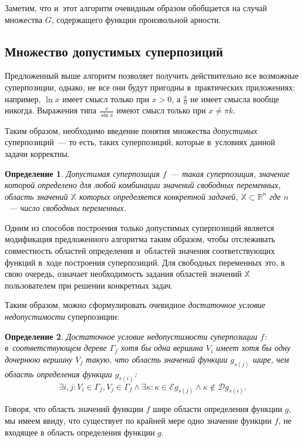 \documentclass[12pt,a4paper]{article}
\newtheorem{defin}{Определение}
\begin{document}
Заметим, что и~этот алгоритм очевидным образом обобщается на случай
множества $G$, содержащего функции произвольной арности.

\subsection{Множество допустимых суперпозиций}

Предложенный выше алгоритм позволяет получить действительно все возможные
суперпозиции, однако, не все они будут пригодны в~практических приложениях:
например, $\ln x$ имеет смысл только при $x > 0$, а $\frac{x}{0}$ не имеет
смысла вообще никогда. Выражения типа $\frac{x}{\sin x}$ имеют смысл только
при $x \neq \pi k$.

Таким образом, необходимо введение понятия множества \emph{допустимых}
суперпозиций~--- то есть, таких суперпозиций, которые в~условиях данной
задачи корректны.

\begin{defin}
  Допустимая суперпозиция $f$~--- такая суперпозиция, значение которой
  определено для любой комбинации значений свободных переменных, область
  значений $\mathbb{X}$ которых определяется конкретной задачей,
  $\mathbb{X} \subset \mathbb{R}^n$ где $n$~--- число свободных переменных.
\end{defin}

Одним из способов построения только допустимых суперпозиций является
модификация предложенного алгоритма таким образом, чтобы отслеживать
совместность областей определения и~областей значения соответствующих
функций в~ходе построения суперпозиций. Для свободных переменных это,
в свою очередь, означает необходимость задания областей значений
$\mathbb{X}$ пользователем при решении конкретных задач.

Таким образом, можно сформулировать очевидное \emph{достаточное условие
недопустимости} суперпозиции:

\begin{defin}
  \label{defin:suff_not_allowed}
  Достаточное условие недопустимости суперпозиции $f$: в~соответствующем дереве
  $\Gamma_f$ хотя бы одна вершина $V_i$ имеет хотя бы одну дочернюю вершину
  $V_j$ такую, что область значений функции $g_{s(j)}$ шире, чем область
  определения функции $g_{s(i)}$:
  \[
  \exists i, j : V_i \in \Gamma_f, V_j \in \Gamma_f \wedge \exists \kappa :
	\kappa \in \mathcal{E} g_{s(j)} \wedge \kappa \notin \mathcal{D} g_{s(i)}.
  \]
\end{defin}

Говоря, что область значений функции $f$ шире области определения функции
$g$, мы имеем ввиду, что существует по крайней мере одно значение функции
$f$, не входящее в область определения функции $g$.
\end{document}
